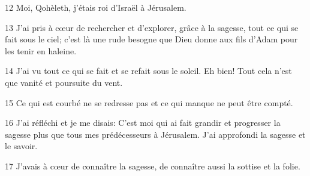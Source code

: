 
12 Moi, Qohèleth, j’étais roi d’Israël à Jérusalem.

13 J’ai pris à cœur de rechercher et d’explorer, grâce à la sagesse, tout ce qui se fait sous le ciel; c’est là une rude besogne que Dieu donne aux fils d’Adam pour les tenir en haleine.

14 J’ai vu tout ce qui se fait et se refait sous le soleil. Eh bien! Tout cela n’est que vanité et poursuite du vent.

15 Ce qui est courbé ne se redresse pas et ce qui manque ne peut être compté.

16 J’ai réfléchi et je me disais: C’est moi qui ai fait grandir et progresser la sagesse plus que tous mes prédécesseurs à Jérusalem. J’ai approfondi la sagesse et le savoir.

17 J’avais à cœur de connaître la sagesse, de connaître aussi la sottise et la folie.